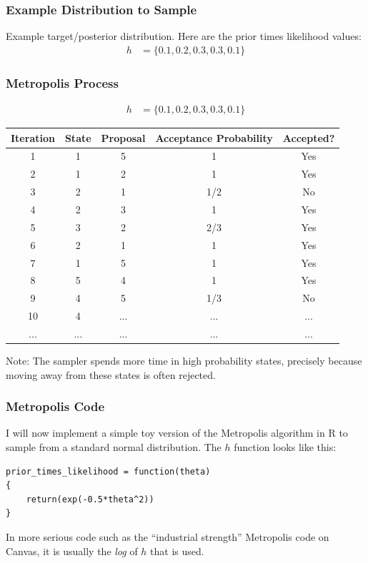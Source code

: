 \documentclass{beamer}
\begin{document}
\begin{frame}
\frametitle{Example Distribution to Sample}
Example target/posterior distribution. Here are the prior times likelihood
values:
\begin{align}
h &= \{ 0.1, 0.2, 0.3, 0.3, 0.1 \}
\end{align}

\end{frame}


\begin{frame}
\frametitle{Metropolis Process}
\begin{center}
\begin{align}
h &= \{ 0.1, 0.2, 0.3, 0.3, 0.1 \}
\end{align}
{\tiny
\begin{tabular}{|c|c|c|c|c|}
\hline
Iteration & State & Proposal & Acceptance Probability & Accepted? \\
\hline 
1         & 1     & 5        & 1                      & Yes \\
2         & 1     & 2        & 1                      & Yes \\
3         & 2     & 1        & 1/2                    & No \\
4         & 2     & 3        & 1                      & Yes \\
5         & 3     & 2        & 2/3                    & Yes \\
6         & 2     & 1        & 1                      & Yes \\
7         & 1     & 5        & 1                      & Yes \\
8         & 5     & 4        & 1                      & Yes \\
9         & 4     & 5        & 1/3                    & No \\
10        & 4     & ... & ... & ... \\
... & ... & ... & ... & ...  \\
\hline
\end{tabular}
} %
\end{center}
\pause

Note: The sampler spends more time in high probability states, precisely
because moving away from these states is often rejected.
\end{frame}


\begin{frame}[fragile]
\frametitle{Metropolis Code}

I will now implement a simple toy version of the Metropolis algorithm in R
to sample from a standard normal distribution. The $h$ function looks like this:

\begin{verbatim}
prior_times_likelihood = function(theta)
{
    return(exp(-0.5*theta^2))
}
\end{verbatim}
\pause

In more serious code such as the ``industrial strength'' Metropolis code on
Canvas, it is usually the {\em log} of $h$ that is used.
\end{frame}
\end{document}
